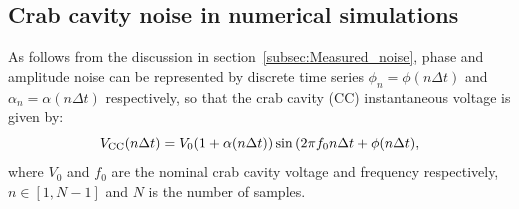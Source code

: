 










\subsection{Crab cavity noise in numerical simulations}
As follows from the discussion in section~\ref{subsec:Measured_noise}, phase and amplitude noise can be represented by discrete time series $\phi_n = \phi(n\Delta t)$ and  $\alpha_n = \alpha(n\Delta t)$ respectively, so that the crab cavity (CC) instantaneous voltage is given by:
\begin{equation}\label{eq:CC_PN_AN}
    {V_\mathrm{CC}} (n \Delta t) =  V_0(1+\alpha(n \Delta t)) \sin{(2\pi f_0 n \Delta t + \phi(n \Delta t)},
\end{equation}
where $V_0$ and $f_0$ are the nominal crab cavity voltage and frequency respectively, $n \in \left [1, N-1 \right ]$ and $N$ is the number of samples.

